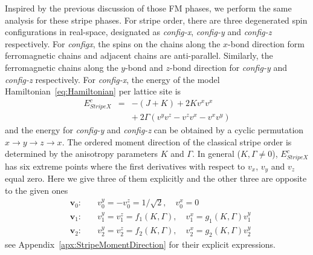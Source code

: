 \documentclass[aps,prb,reprint,amsfonts,amsmath,amssymb,showpacs,groupedaddress,superscriptaddress]{revtex4-1}
\begin{document}
Inspired by the previous discussion of those FM phases, we perform the same analysis for these stripe phases. For stripe order, there are three degenerated spin configurations in real-space, designated as \emph{config-x}, \emph{config-y} and \emph{config-z} respectively. For \emph{configx}, the spins on the chains along the $x$-bond direction form ferromagnetic chains and adjacent chains are anti-parallel. Similarly, the ferromagnetic chains along the $y$-bond and $z$-bond direction for \emph{config-y} and \emph{config-z} respectively. For \emph{config-x}, the energy of the model Hamiltonian~\eqref{eq:Hamiltonian} per lattice site is
\begin{eqnarray}
    E_{StripeX}^{c} & = & -(J + K) + 2 K v^x v^x \nonumber \\
        & & +\: 2 \Gamma (v^y v^z - v^z v^x - v^x v^y)
        \label{eq:EcStripeX}
\end{eqnarray}
and the energy for \emph{config-y} and \emph{config-z} can be obtained by a cyclic permutation $x \rightarrow y \rightarrow z \rightarrow x$. The ordered moment direction of the classical stripe order is determined by the anisotropy parameters $K$ and $\Gamma$. In general ($K,\Gamma \neq 0$), $E_{StripeX}^{c}$ has six extreme points where the first derivatives with respect to $v_x$, $v_y$ and $v_z$ equal zero. Here we give three of them explicitly and the other three are opposite to the given ones
\begin{subequations}
    \label{eq:whole}
    \begin{eqnarray}
        & \bm{v}_0:& \quad v_{0}^{y}=-v_{0}^{z} = 1/\sqrt{2}, \quad v_{0}^{x} = 0 \label{eq:v0} \\
        & \bm{v}_1:& \quad v_{1}^{y}=v_{1}^{z} = f_{1}(K, \Gamma), \quad v_{1}^{x} = g_{1}(K, \Gamma) v_{1}^{y} \label{eq:v1} \\
        & \bm{v}_2:& \quad v_{2}^{y}=v_{2}^{z} = f_{2}(K, \Gamma), \quad v_{2}^{x} = g_{2}(K, \Gamma) v_{2}^{y} \label{eq:v2}
    \end{eqnarray}
\end{subequations}
see Appendix~\ref{apx:StripeMomentDirection} for their explicit expressions.
\end{document}
